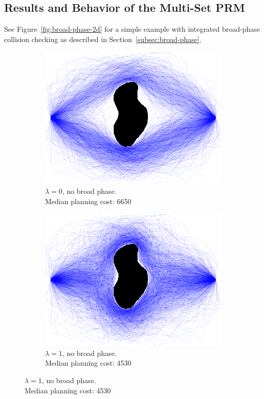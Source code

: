 \subsection{Results and Behavior of the Multi-Set PRM}

See Figure~\ref{fig:broad-phase-2d}
for a simple example with integrated broad-phase collision checking
as described in Section~\ref{subsec:broad-phase}.

\begin{figure}
\centering

\begin{subfigure}[t]{0.45\linewidth}
\centering
\includegraphics[width=\columnwidth]{figs/paths-lambda0-norel.png}
\caption{
  $\lambda=0$, no broad phase.\\
  Median planning cost: 6650}
\end{subfigure}
\begin{subfigure}[t]{0.45\linewidth}
\centering
\includegraphics[width=\columnwidth]{figs/paths-lambda1-norel.png}
\caption{
  $\lambda=1$, no broad phase.\\
  Median planning cost: 4530}
\end{subfigure}


\end{figure}
